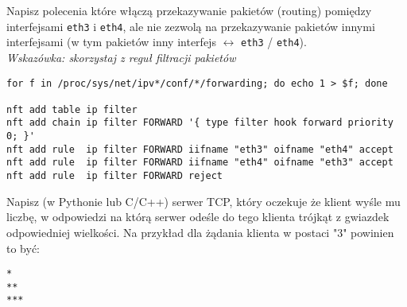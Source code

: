 \dbEntryCheckResults
Napisz polecenia które włączą przekazywanie pakietów (routing) pomiędzy interfejsami \Verb#eth3# i \Verb#eth4#, ale nie zezwolą na przekazywanie pakietów innymi interfejsami (w tym pakietów inny interfejs $\leftrightarrow$ \Verb#eth3# / \Verb#eth4#).
\\
\textit{Wskazówka: skorzystaj z reguł filtracji pakietów}
\fi

\dbEntryCheckResults
\begin{Verbatim}
for f in /proc/sys/net/ipv*/conf/*/forwarding; do echo 1 > $f; done

nft add table ip filter
nft add chain ip filter FORWARD '{ type filter hook forward priority 0; }'
nft add rule  ip filter FORWARD iifname "eth3" oifname "eth4" accept
nft add rule  ip filter FORWARD iifname "eth4" oifname "eth3" accept
nft add rule  ip filter FORWARD reject
\end{Verbatim}
\fi


\dbEntryCheckResults
Napisz (w Pythonie lub C/C++) serwer TCP, który oczekuje że klient wyśle mu liczbę, w odpowiedzi na którą serwer odeśle do tego klienta trójkąt z gwiazdek odpowiedniej wielkości.
Na przykład dla żądania klienta w postaci "3" powinien to być:
\begin{Verbatim}
*
**
***
\end{Verbatim}
\fi

